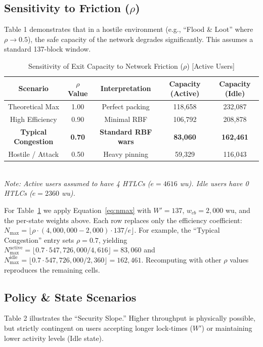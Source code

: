 \documentclass{article}
\theoremstyle{definition}
\begin{document}
\subsection{Sensitivity to Friction (\texorpdfstring{$\rho$}{rho})}
Table 1 demonstrates that in a hostile environment (e.g., ``Flood \& Loot'' where $\rho \to 0.5$), the safe capacity of the network degrades significantly. This assumes a standard 137-block window.

\begin{table}[h]
\centering
\caption{Sensitivity of Exit Capacity to Network Friction ($\rho$) [Active Users]}\label{tab:rho}
\begin{tabular}{@{}ccccc@{}}
\toprule
Scenario & $\rho$ Value & Interpretation & Capacity (Active) & Capacity (Idle) \\
\midrule
Theoretical Max & 1.00 & Perfect packing & 118,658 & 232,087 \\
High Efficiency & 0.90 & Minimal RBF & 106,792 & 208,878 \\
\textbf{Typical Congestion} & \textbf{0.70} & \textbf{Standard RBF wars} & \textbf{83,060} & \textbf{162,461} \\
Hostile / Attack & 0.50 & Heavy pinning & 59,329 & 116,043 \\
\bottomrule
\end{tabular}
\footnotesize{\\ \emph{Note: Active users assumed to have 4 HTLCs ($e=4616$ wu). Idle users have 0 HTLCs ($e=2360$ wu).}}
\end{table}

For Table~\ref{tab:rho} we apply Equation~\eqref{eq:nmax} with $W'=137$, $w_{cb}=2{,}000$ wu, and the per-state weights above. Each row replaces only the efficiency coefficient: $N_{\max} = \lfloor \rho \cdot (4{,}000{,}000 - 2{,}000) \cdot 137 / e \rfloor$. For example, the ``Typical Congestion'' entry sets $\rho=0.7$, yielding $N_{\max}^{\mathrm{active}} = \lfloor 0.7 \cdot 547{,}726{,}000 / 4{,}616 \rfloor = 83{,}060$ and $N_{\max}^{\mathrm{idle}} = \lfloor 0.7 \cdot 547{,}726{,}000 / 2{,}360 \rfloor = 162{,}461$. Recomputing with other $\rho$ values reproduces the remaining cells.

\subsection{Policy \& State Scenarios}
Table 2 illustrates the ``Security Slope.'' Higher throughput is physically possible, but strictly contingent on users accepting longer lock-times ($W'$) or maintaining lower activity levels (Idle state).
\end{document}
